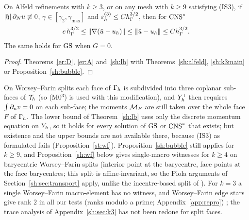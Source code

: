 \begin{corollary}\label{sh:sharp}
On Alfeld refinements with $k\ge3$, or on any mesh with $k\ge9$ satisfying (IS3), if $|\mathfrak h|\,\partial_Nu\not\equiv0$, $\gamma\in[\gamma_2,\gamma_{\max}]$ and $\varepsilon_h^{(3)}\le Ch_\Gamma^{3/2}$, then for $\mathrm{CNS}^\ast$
\[
c\,h_\Gamma^{3/2}\le\lVert \nabla(\tilde u-u_h)\rVert\le|\!|\!|\tilde u-u_h|\!|\!|\le Ch_\Gamma^{3/2}.
\]
The same holds for $\mathrm{GS}$ when $G=0$.
\end{corollary}

\begin{proof}
Theorems~\ref{er:D}, \ref{er:A} and~\ref{sh:lb} with Theorems~\ref{sh:alfeld}, \ref{sh:k3main} or Proposition~\ref{sh:bubble}.
\end{proof}

\begin{remark}\label{sh:rem:wf}
On Worsey--Farin splits each face of $\Gamma_h$ is subdivided into three coplanar sub-faces of $\mathcal T_h$ (so (M0$^3$) is used with this modification), and $Y_h^1$ then requires $\int\partial_n v=0$ on each sub-face; the moments $\mathcal M_F$ are still taken over the whole face $F$ of $\Gamma_h$. The lower bound of Theorem~\ref{sh:lb} uses only the discrete momentum equation on $Y_h$, so it holds for every solution of $\mathrm{GS}$ or $\mathrm{CNS}^\ast$ that exists; but existence and the upper bounds are not available there, because (IS3) as formulated fails (Proposition~\ref{st:wf}). Proposition~\ref{sh:bubble} still applies for $k\ge9$, and Proposition~\ref{sh:wf} below gives single-macro witnesses for $k\ge4$ on barycentric Worsey--Farin splits (interior point at the barycentre, face points at the face barycentres; this split is affine-invariant, so the Piola arguments of Section~\ref{sh:sec:transport} apply, unlike the incentre-based split of \cite{GuzmanLischkeNeilan2022}). For $k=3$ a single Worsey--Farin macro-element has no witness, and Worsey--Farin edge stars give rank $2$ in all our tests (ranks modulo a prime; Appendix~\ref{app:repro}) ; the trace analysis of Appendix~\ref{sh:sec:k3} has not been redone for split faces.
\end{remark}

